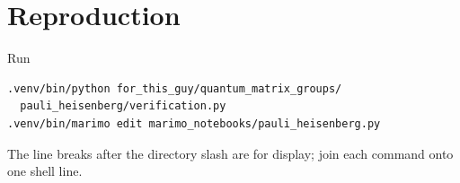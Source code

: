 \documentclass[11pt]{article}
\begin{document}
\section{Reproduction}
Run
\begin{verbatim}
.venv/bin/python for_this_guy/quantum_matrix_groups/
  pauli_heisenberg/verification.py
.venv/bin/marimo edit marimo_notebooks/pauli_heisenberg.py
\end{verbatim}
The line breaks after the directory slash are for display; join each command
onto one shell line.
\end{document}

